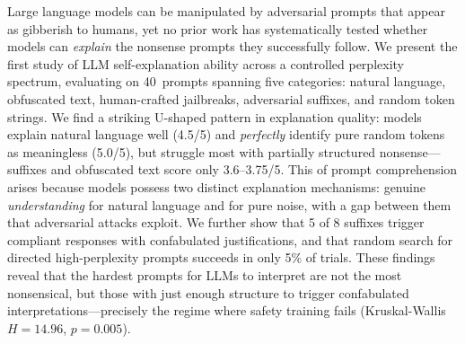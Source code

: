 Large language models can be manipulated by adversarial prompts that appear as gibberish to humans, yet no prior work has systematically tested whether models can \emph{explain} the nonsense prompts they successfully follow.
We present the first study of LLM self-explanation ability across a controlled perplexity spectrum, evaluating \gptfour on 40~prompts spanning five categories: natural language, obfuscated text, human-crafted jailbreaks, \gcg adversarial suffixes, and random token strings.
We find a striking U-shaped pattern in explanation quality: models explain natural language well (4.5/5) and \emph{perfectly} identify pure random tokens as meaningless (5.0/5), but struggle most with partially structured nonsense---\gcg suffixes and obfuscated text score only 3.6--3.75/5.
This \uncannyvalley of prompt comprehension arises because models possess two distinct explanation mechanisms: genuine \emph{understanding} for natural language and \metarecog for pure noise, with a gap between them that adversarial attacks exploit.
We further show that 5 of 8 \gcg suffixes trigger compliant responses with confabulated justifications, and that random search for directed high-perplexity prompts succeeds in only 5\% of trials.
These findings reveal that the hardest prompts for LLMs to interpret are not the most nonsensical, but those with just enough structure to trigger confabulated interpretations---precisely the regime where safety training fails (Kruskal-Wallis $H = 14.96$, $p = 0.005$).
